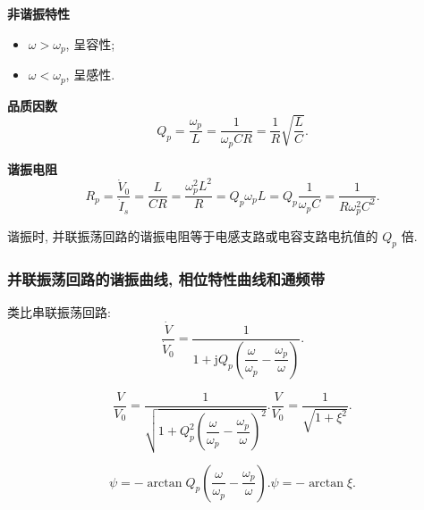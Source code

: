 \textbf{非谐振特性}

\begin{itemize}
    \item $\omega>\omega_p$, 呈容性;
    \item $\omega<\omega_p$, 呈感性.
\end{itemize}

\textbf{品质因数}
\begin{equation}
    Q_p=\frac{\omega_p}{L}=\frac{1}{\omega_pCR}=\frac{1}{R}\sqrt{\frac{L}{C}}.
\end{equation}

\textbf{谐振电阻}
\begin{equation}
    R_p=\frac{\dot{V}_0}{\dot{I}_s}=\frac{L}{CR}=\frac{\omega_p^2L^2}{R}=Q_p\omega_pL=Q_p\frac{1}{\omega_pC}=\frac{1}{R\omega_p^2C^2}.
\end{equation}

谐振时, 并联振荡回路的谐振电阻等于电感支路或电容支路电抗值的 $Q_p$ 倍.

\subsubsection{并联振荡回路的谐振曲线, 相位特性曲线和通频带}

类比串联振荡回路:
\begin{equation}
    \frac{\dot{V}}{\dot{V}_0}=\frac{1}{1+\mathrm{j}Q_p\left(\dfrac{\omega}{\omega_p}-\dfrac{\omega_p}{\omega}\right)}.
\end{equation}

\begin{subequations}
    \begin{equation}
        \frac{V}{V_0}=\frac{1}{\sqrt{1+Q_p^2\left(\dfrac{\omega}{\omega_p}-\dfrac{\omega_p}{\omega}\right)^2}}.
    \end{equation}
    \begin{equation}
        \frac{V}{V_0}=\frac{1}{\sqrt{1+\xi^2}}.
    \end{equation}
\end{subequations}

\begin{subequations}
    \begin{equation}
        \psi=-\arctan Q_p\left(\frac{\omega}{\omega_p}-\frac{\omega_p}{\omega}\right).
    \end{equation}
    \begin{equation}
        \psi=-\arctan\xi.
    \end{equation}
\end{subequations}

